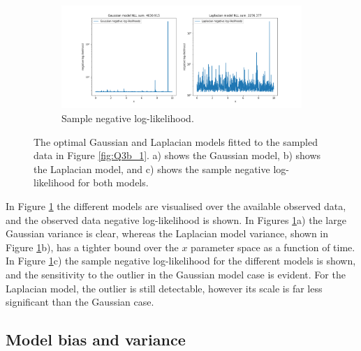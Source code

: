 \documentclass{article}
\begin{document}
\begin{figure}[!htb]
     \begin{subfigure}[b]{0.8\textwidth}
         \centering
         \includegraphics[width=\textwidth]{Q3b_fig8.png}
         \caption{Sample negative log-likelihood.}
     \end{subfigure}
        \caption{The optimal Gaussian and Laplacian models fitted to the sampled data in Figure \ref{fig:Q3b_1}. a) shows the Gaussian model, b) shows the Laplacian model, and c) shows the sample negative log-likelihood for both models.}
        \label{fig:Q3b_2}
\end{figure}

In Figure \ref{fig:Q3b_2} the different models are visualised over the available observed data, and the observed data negative log-likelihood is shown. In Figures \ref{fig:Q3b_2}a) the large Gaussian variance is clear, whereas the Laplacian model variance, shown in Figure \ref{fig:Q3b_2}b), has a tighter bound over the $x$ parameter space as a function of time. In Figure \ref{fig:Q3b_2}c) the sample negative log-likelihood for the different models is shown, and the sensitivity to the outlier in the Gaussian model case is evident. For the Laplacian model, the outlier is still detectable, however its scale is far less significant than the Gaussian case.

\subsection{Model bias and variance}
\end{document}
